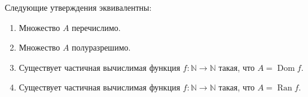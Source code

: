 \documentclass{article}
\begin{document}
    \begin{theorem}
        Следующие утверждения эквивалентны:
        \begin{enumerate}
            \item Множество $A$ перечислимо.
            \item Множество $A$ полуразрешимо.
            \item Существует частичная вычислимая функция $f: \mathbb{N} \to \mathbb{N}$ такая, что
                $A = \operatorname{Dom} f$.
            \item Существует частичная вычислимая функция $f: \mathbb{N} \to \mathbb{N}$ такая, что
                $A = \operatorname{Ran} f$.
        \end{enumerate}
    \end{theorem}
\end{document}
